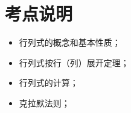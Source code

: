 \section{考点说明}
\begin{itemize}
\item 行列式的概念和基本性质；
\item 行列式按行（列）展开定理；
\item 行列式的计算；
\item 克拉默法则；
\end{itemize}

